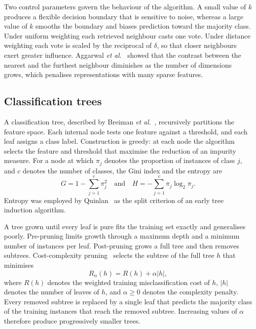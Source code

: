 Two control parameters govern the behaviour of the algorithm. A small value
of $k$ produces a flexible decision boundary that is sensitive to noise,
whereas a large value of $k$ smooths the boundary and biases prediction
toward the majority class. Under uniform weighting each retrieved neighbour
casts one vote. Under distance weighting each vote is scaled by the
reciprocal of $\delta$, so that closer neighbours exert greater influence.
Aggarwal \textit{et al.}~\cite{aggarwal2001} showed that the contrast
between the nearest and the furthest neighbour diminishes as the number of
dimensions grows, which penalises representations with many sparse
features.

\subsection{Classification trees}
\label{sec:bg-tree}

A classification tree, described by Breiman
\textit{et al.}~\cite{breiman1984}, recursively partitions the feature space.
Each internal node tests one feature against a threshold, and each leaf
assigns a class label. Construction is greedy: at each node the algorithm
selects the feature and threshold that maximise the reduction of an impurity
measure. For a node at which $\pi_j$ denotes the proportion of instances of
class $j$, and $c$ denotes the number of classes, the Gini index and the
entropy are
\begin{equation}
G = 1 - \sum_{j=1}^{c} \pi_j^2
\quad\text{and}\quad
H = -\sum_{j=1}^{c} \pi_j \log_2 \pi_j.
\label{eq:impurity}
\end{equation}
Entropy was employed by Quinlan~\cite{quinlan1986} as the split criterion of an early tree induction algorithm.

A tree grown until every leaf is pure fits the training set exactly and
generalises poorly. Pre-pruning limits growth through a maximum depth and a
minimum number of instances per leaf. Post-pruning grows a full tree and then
removes subtrees. Cost-complexity pruning~\cite{breiman1984} selects the
subtree of the full tree $h$ that minimises
\begin{equation}
R_\alpha(h) = R(h) + \alpha |h|,
\label{eq:ccp}
\end{equation}
where $R(h)$ denotes the weighted training misclassification cost of $h$,
$|h|$ denotes the number of leaves of $h$, and $\alpha \geq 0$ denotes the
complexity penalty. Every removed subtree is replaced by a single leaf that
predicts the majority class of the training instances that reach the
removed subtree. Increasing values of $\alpha$ therefore produce
progressively smaller trees.

